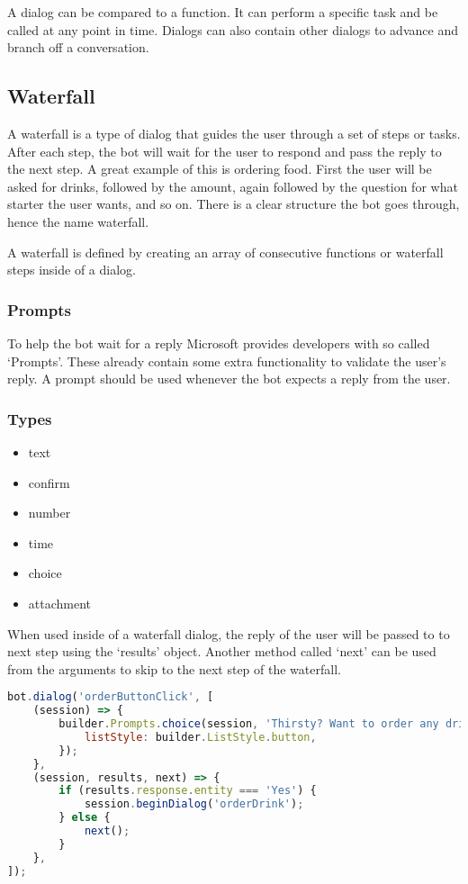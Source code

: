 A dialog can be compared to a function. It can perform a specific task and be called at any point in time. Dialogs can also contain other dialogs to advance and branch off a conversation.

\subsection{Waterfall}

A waterfall is a type of dialog that guides the user through a set of steps or tasks. After each step, the bot will wait for the user to respond and pass the reply to the next step. A great example of this is ordering food. First the user will be asked for drinks, followed by the amount, again followed by the question for what starter the user wants, and so on. There is a clear structure the bot goes through, hence the name waterfall.

A waterfall is defined by creating an array of consecutive functions or waterfall steps inside of a dialog.

\subsubsection{Prompts}

To help the bot wait for a reply Microsoft provides developers with so called `Prompts'. These already contain some extra functionality to validate the user's reply. A prompt should be used whenever the bot expects a reply from the user.

\subsubsection{Types}

\begin{itemize}
	\item text
	\item confirm
	\item number
	\item time
	\item choice
	\item attachment
\end{itemize}

When used inside of a waterfall dialog, the reply of the user will be passed to to next step using the `results' object. Another method called `next' can be used from the arguments to skip to the next step of the waterfall.

\begin{lstlisting}[language=JavaScript,caption=2-step waterfall using a prompt,label=listing:waterfall-and-prompt]
bot.dialog('orderButtonClick', [
	(session) => {
		builder.Prompts.choice(session, 'Thirsty? Want to order any drinks?', 'Yes|No drinks', {
			listStyle: builder.ListStyle.button,
		});
	},
	(session, results, next) => {
		if (results.response.entity === 'Yes') {
			session.beginDialog('orderDrink');
		} else {
			next();
		}
	},
]);
\end{lstlisting}

